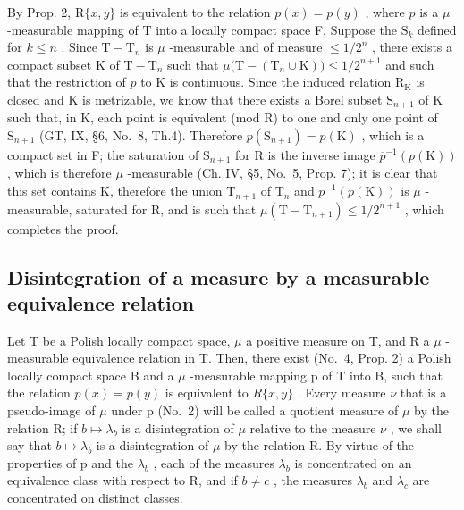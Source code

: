 By Prop. 2, \(\mathrm{R}\{x,y\}\) is equivalent to the relation \(p(x)=p(y)\) , where \(p\) is a \(\mu\) -measurable mapping of T into a locally compact space F. Suppose the \(\mathrm{S}_{k}\) defined for \(k\leqslant n\) . Since \(\mathrm{T}-\mathrm{T}_{n}\) is \(\mu\) -measurable and of measure \(\leqslant 1/2^{n}\) , there exists a compact subset K of \(\mathrm{T}-\mathrm{T}_{n}\) such that \(\mu\big(\mathrm{T}-(\mathrm{T}_{n}\cup\mathrm{K})\big)\leqslant 1/2^{n+1}\) and such that the restriction of \(p\) to K is continuous. Since the induced relation \(\mathrm{R}_{\mathrm{K}}\) is closed and K is metrizable, we know that there exists a Borel subset \(\mathrm{S}_{n+1}\) of K such that, in K, each point is equivalent (mod R) to one and only one point of \(\mathrm{S}_{n+1}\) (GT, IX, §6, No.~8, Th.4). Therefore \(p(\mathrm{S}_{n+1})=p(\mathrm{K})\) , which is a compact set in F; the saturation of \(\mathrm{S}_{n+1}\) for R is the inverse image \(\overline{p}^{-1}(p(\mathrm{K}))\) , which is therefore \(\mu\) -measurable (Ch. IV, §5, No.~5, Prop. 7); it is clear that this set contains K, therefore the union \(\mathrm{T}_{n+1}\) of \(\mathrm{T}_n\) and \(\overline{p}^{-1}(p(\mathrm{K}))\) is \(\mu\) -measurable, saturated for R, and is such that \(\mu(\mathrm{T} - \mathrm{T}_{n+1}) \leqslant 1/2^{n+1}\) , which completes the proof.

\subsection{Disintegration of a measure by a measurable equivalence relation}

Let T be a Polish locally compact space, \(\mu\) a positive measure on T, and R a \(\mu\) -measurable equivalence relation in T. Then, there exist (No.~4, Prop. 2) a Polish locally compact space B and a \(\mu\) -measurable mapping p of T into B, such that the relation \(p(x) = p(y)\) is equivalent to \(R\{x, y\}\) . Every measure \(\nu\) that is a pseudo-image of \(\mu\) under p (No.~2) will be called a quotient measure of \(\mu\) by the relation R; if \(b \mapsto \lambda_b\) is a disintegration of \(\mu\) relative to the measure \(\nu\) , we shall say that \(b \mapsto \lambda_b\) is a disintegration of \(\mu\) by the relation R. By virtue of the properties of p and the \(\lambda_b\) , each of the measures \(\lambda_b\) is concentrated on an equivalence class with respect to R, and if \(b \neq c\) , the measures \(\lambda_b\) and \(\lambda_c\) are concentrated on distinct classes.

